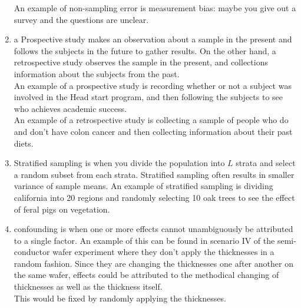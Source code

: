 \documentclass{article}
\begin{document}
\begin{enumerate}
An example of non-sampling error is measurement bias: maybe you give out a survey and the questions are unclear. \\
\item a Prospective study makes an observation about a sample in the present and follows the subjects in the future to gather results. On the other hand, a retrospective study observes the sample in the present, and collections information about the subjects from the past. \\
An example of a prospective study is recording whether or not a subject was involved in the Head start program, and then following the subjects to see who achieves academic success. \\
An example of a retrospective study is collecting a sample of people who do and don't have colon cancer and then collecting information about their past diets. \\
\item Stratified sampling is when you divide the population into $L$ strata and select a random subset from each strata. Stratified sampling often results in smaller variance of sample means. An example of stratified sampling is dividing california into 20 regions and randomly selecting 10 oak trees to see the effect of feral pigs on vegetation. \\
\item confounding is when one or more effects cannot unambiguously be attributed to a single factor. An example of this can be found in scenario IV of the semi-conductor wafer experiment where they don't apply the thicknesses in a random fashion. Since they are changing the thicknesses one after another on the same wafer, effects could be attributed to the methodical changing of thicknesses as well as the thickness itself. \\
This would be fixed by randomly applying the thicknesses.\\
\end{enumerate}
\end{document}
